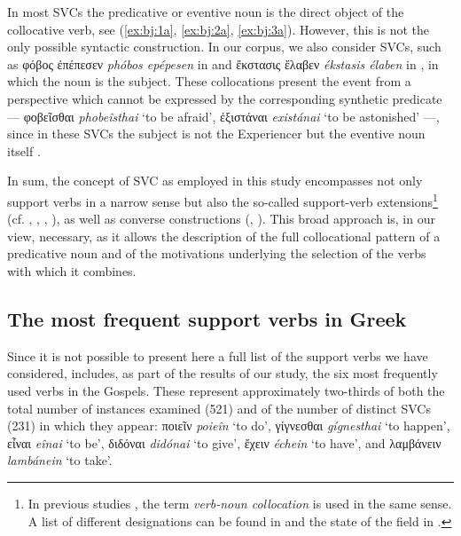 \documentclass[output=paper,colorlinks,citecolor=brown]{langscibook}
\begin{document}
\z

\z

In most SVCs the predicative or eventive noun is the direct object of the collocative verb, see
(\ref{ex:bj:1a}, \ref{ex:bj:2a}, \ref{ex:bj:3a}). However, this is not the only possible
syntactic construction. In our corpus, we also consider SVCs, such as φόβος ἐπέπεσεν
\emph{phóbos epépesen} in  and ἔκστασις ἔλαβεν \emph{ékstasis élaben}
in , in which the noun is the subject. These collocations present the event from a
perspective which cannot be expressed by the corresponding synthetic predicate
 --- φοβεῖσθαι \emph{phobeîsthai} `to be afraid', ἐξιστάναι \emph{existánai} `to be
astonished' ---, since in these SVCs the subject is not the Experiencer but the eventive
noun itself
\parencites{BenedettiMarina-2010117,BenedettiMarina-2013672,Tur2019,JiménezLópez2024}.


In sum, the concept of SVC as employed in this study encompasses not only support verbs in a
narrow sense but also the so-called support-verb extensions\footnote{In previous studies
  \parencites{BañosJoséMiguel-2015206,BañosJiménezLópez2017a,BañosJiménezLópez2017b,BañosJoséMiguelJiménezLópezM.Dolores-2022707,JiménezLópezM.Dolores-2018285},
  the term \emph{verb-noun collocation} is used in the same sense. A list of different
  designations can be found in \citet[25--28]{HoffmannRoland-202223} and the state of the
  field in \citet{PompeiPiunnointro2023}.} (cf. \cite{Gross1981}, \cite{Vivès1983},
\cite{Cicalese1999}, \cite{JežekElisabetta-2004615}), as well as converse constructions
(\cite{Gross1989}, \cite{Mendózar2020}). This broad approach is, in our view, necessary,
as it allows the description of the full collocational pattern of a predicative noun and
of the motivations underlying the selection of the verbs with which it combines.

\subsection{The most frequent support verbs in Greek}\label{sec:bj:2:1}

Since it is not possible to present here a full list of the support verbs we have
considered,  includes, as part of the results of our study, the
six most frequently used verbs in the Gospels. These represent approximately two-thirds of
both the total number of instances examined (521) and of the number of distinct SVCs (231)
in which they appear: ποιεῖν \emph{poieîn} `to do', γίγνεσθαι \emph{gígnesthai} `to
happen', εἶναι \emph{eînai} `to be', διδόναι \emph{didónai} `to give', ἔχειν
\emph{échein} `to have', and λαμβάνειν \emph{lambánein} `to take'.
\end{document}
